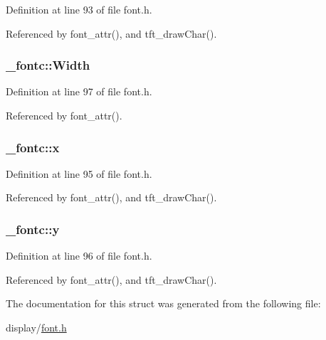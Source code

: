 Definition at line 93 of file font.\-h.



Referenced by font\-\_\-attr(), and tft\-\_\-draw\-Char().

\hypertarget{struct__fontc_ae3c802e1c35ae9a4e37c8eb2e9644325}{
\subsubsection[{Width}]{ \-\_\-fontc\-::\-Width}}\label{struct__fontc_ae3c802e1c35ae9a4e37c8eb2e9644325}


Definition at line 97 of file font.\-h.



Referenced by font\-\_\-attr().

\hypertarget{struct__fontc_ad15d00ed46ebe52a085cf05b5ca5da90}{
\subsubsection[{x}]{ \-\_\-fontc\-::x}}\label{struct__fontc_ad15d00ed46ebe52a085cf05b5ca5da90}


Definition at line 95 of file font.\-h.



Referenced by font\-\_\-attr(), and tft\-\_\-draw\-Char().

\hypertarget{struct__fontc_aebbde0dc41068722ee1a69f4a56478a4}{
\subsubsection[{y}]{ \-\_\-fontc\-::y}}\label{struct__fontc_aebbde0dc41068722ee1a69f4a56478a4}


Definition at line 96 of file font.\-h.



Referenced by font\-\_\-attr(), and tft\-\_\-draw\-Char().



The documentation for this struct was generated from the following file\-:\begin{DoxyCompactItemize}
\item 
display/\hyperlink{display_2font_8h}{font.\-h}\end{DoxyCompactItemize}
